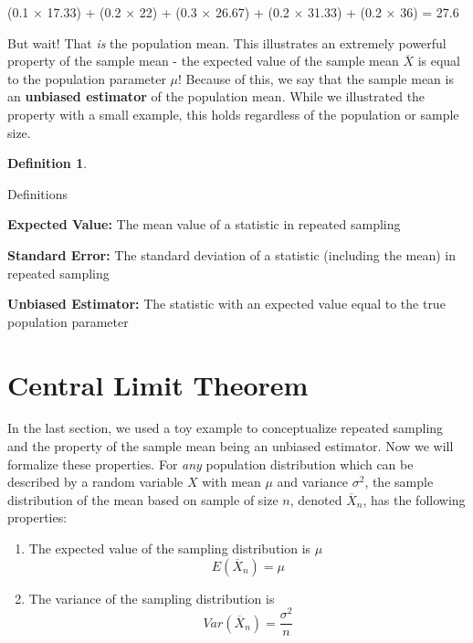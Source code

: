 \documentclass[
]{book}
\providecommand{\tightlist}{%
  \setlength{\itemsep}{0pt}\setlength{\parskip}{0pt}}
\theoremstyle{definition}
\newtheorem{definition}{Definition}[chapter]
\theoremstyle{definition}
\theoremstyle{definition}
\theoremstyle{remark}
\begin{document}
(0.1 \(\times\) 17.33) + (0.2 \(\times\) 22) + (0.3 \(\times\) 26.67) + (0.2 \(\times\) 31.33) + (0.2 \(\times\) 36) = 27.6

But wait! That \emph{is} the population mean. This illustrates an extremely powerful property of the sample mean - the expected value of the sample mean \(\overline{X}\) is equal to the population parameter \(\mu\)! Because of this, we say that the sample mean is an \textbf{unbiased estimator} of the population mean. While we illustrated the property with a small example, this holds regardless of the population or sample size.

\begin{definition}
\protect\hypertarget{def:unlabeled-div-5}{}\label{def:unlabeled-div-5}

Definitions

\end{definition}

\textbf{Expected Value: } The mean value of a statistic in repeated sampling

\textbf{Standard Error: } The standard deviation of a statistic (including the mean) in repeated sampling

\textbf{Unbiased Estimator: } The statistic with an expected value equal to the true population parameter

\hypertarget{central-limit-theorem}{%
\section{Central Limit Theorem}\label{central-limit-theorem}}

In the last section, we used a toy example to conceptualize repeated sampling and the property of the sample mean being an unbiased estimator. Now we will formalize these properties. For \emph{any} population distribution which can be described by a random variable \(X\) with mean \(\mu\) and variance \(\sigma^2\), the sample distribution of the mean based on sample of size \(n\), denoted \(\overline{X}_n\), has the following properties:

\begin{enumerate}
\def\labelenumi{\arabic{enumi})}
\tightlist
\item
  The expected value of the sampling distribution is \(\mu\)
  \[E(\overline{X}_n) = \mu\]
\item
  The variance of the sampling distribution is
  \[Var(\overline{X}_n) = \frac{\sigma^2}{n}\]
\end{enumerate}
\end{document}
